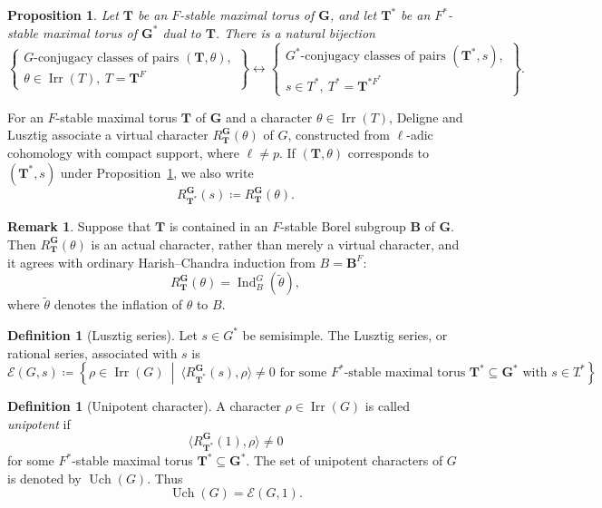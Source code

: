 \documentclass{amsart}
\theoremstyle{plain}
\numberwithin{equation}{section}
\newtheorem{proposition}[theorem]{Proposition}
\theoremstyle{definition}
\newtheorem{definition}[theorem]{Definition}
\newtheorem{remark}[theorem]{Remark}
\newcommand{\cE}{\mathcal{E}}
\newcommand{\Ind}{\operatorname{Ind}}
\newcommand{\Irr}{\operatorname{Irr}}
\newcommand{\Uch}{\operatorname{Uch}}
\newcommand{\bG}{\mathbf{G}}
\newcommand{\bT}{\mathbf{T}}
\newcommand{\bB}{\mathbf{B}}
\begin{document}
\begin{proposition}\label{prop:geometric-conjugacy}
Let \(\bT\) be an \(F\)-stable maximal torus of \(\bG\), and let
\(\bT^*\) be an \(F^*\)-stable maximal torus of \(\bG^*\) dual to \(\bT\).
There is a natural bijection
\[
\left\{
\begin{array}{c}
G\text{-conjugacy classes of pairs }(\bT,\theta),\\
\theta\in\Irr(T),\ T=\bT^F
\end{array}
\right\}
\longleftrightarrow
\left\{
\begin{array}{c}
G^*\text{-conjugacy classes of pairs }(\bT^*,s),\\
s\in T^*,\ T^*=\bT^{*F^*}
\end{array}
\right\}.
\]
\end{proposition}

For an \(F\)-stable maximal torus \(\bT\) of \(\bG\) and a character
\(\theta\in\Irr(T)\), Deligne and Lusztig associate a virtual character
\(R_{\bT}^{\bG}(\theta)\) of \(G\), constructed from \(\ell\)-adic cohomology
with compact support, where \(\ell\neq p\).  If \((\bT,\theta)\) corresponds
to \((\bT^*,s)\) under Proposition~\ref{prop:geometric-conjugacy}, we also
write
\[
R_{\bT^*}^{\bG}(s) \coloneqq R_{\bT}^{\bG}(\theta).
\]

\begin{remark}
Suppose that \(\bT\) is contained in an \(F\)-stable Borel subgroup
\(\bB\) of \(\bG\).  Then \(R_{\bT}^{\bG}(\theta)\) is an actual character,
rather than merely a virtual character, and it agrees with ordinary
Harish--Chandra induction from \(B=\bB^F\):
\[
R_{\bT}^{\bG}(\theta)=\Ind_{B}^{G}(\widetilde{\theta}),
\]
where \(\widetilde{\theta}\) denotes the inflation of \(\theta\) to \(B\).
\end{remark}

\begin{definition}[Lusztig series]
Let \(s\in G^*\) be semisimple.  The Lusztig series, or rational series,
associated with \(s\) is
\[
\cE(G,s)
\coloneqq
\left\{
\rho\in\Irr(G)
\ \middle|\
\langle R_{\bT^*}^{\bG}(s),\rho\rangle\neq 0
\text{ for some }F^*\text{-stable maximal torus }
\bT^*\subseteq \bG^*
\text{ with }s\in T^*
\right\}.
\]
\end{definition}

\begin{definition}[Unipotent character]
A character \(\rho\in\Irr(G)\) is called \emph{unipotent} if
\[
\langle R_{\bT^*}^{\bG}(1),\rho\rangle\neq 0
\]
for some \(F^*\)-stable maximal torus \(\bT^*\subseteq \bG^*\).  The set of
unipotent characters of \(G\) is denoted by \(\Uch(G)\).  Thus
\[
\Uch(G)=\cE(G,1).
\]
\end{definition}
\end{document}

